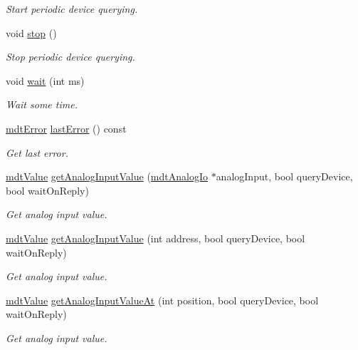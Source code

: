 \begin{DoxyCompactItemize}
\begin{DoxyCompactList}\small\item\em Start periodic device querying. \end{DoxyCompactList}\item 
void \hyperlink{classmdt_device_adc7ff8f01d68506283a3d0cc6bc25407}{stop} ()
\begin{DoxyCompactList}\small\item\em Stop periodic device querying. \end{DoxyCompactList}\item 
void \hyperlink{classmdt_device_a6def09a050cbf3521b615e8300c42f66}{wait} (int ms)
\begin{DoxyCompactList}\small\item\em Wait some time. \end{DoxyCompactList}\item 
\hyperlink{classmdt_error}{mdt\-Error} \hyperlink{classmdt_device_a79ca328ff9e9f413a38c1cc9c9267cee}{last\-Error} () const 
\begin{DoxyCompactList}\small\item\em Get last error. \end{DoxyCompactList}\item 
\hyperlink{classmdt_value}{mdt\-Value} \hyperlink{classmdt_device_ab828764660ba53ffce1995901ddf5a0a}{get\-Analog\-Input\-Value} (\hyperlink{classmdt_analog_io}{mdt\-Analog\-Io} $\ast$analog\-Input, bool query\-Device, bool wait\-On\-Reply)
\begin{DoxyCompactList}\small\item\em Get analog input value. \end{DoxyCompactList}\item 
\hyperlink{classmdt_value}{mdt\-Value} \hyperlink{classmdt_device_ad6a9d73cd51ce21f69dc8e4646d4fcfe}{get\-Analog\-Input\-Value} (int address, bool query\-Device, bool wait\-On\-Reply)
\begin{DoxyCompactList}\small\item\em Get analog input value. \end{DoxyCompactList}\item 
\hyperlink{classmdt_value}{mdt\-Value} \hyperlink{classmdt_device_ae2bc364104f843b037bbbf8aa8a37d8e}{get\-Analog\-Input\-Value\-At} (int position, bool query\-Device, bool wait\-On\-Reply)
\begin{DoxyCompactList}\small\item\em Get analog input value. \end{DoxyCompactList}\item 

\end{DoxyCompactItemize}
